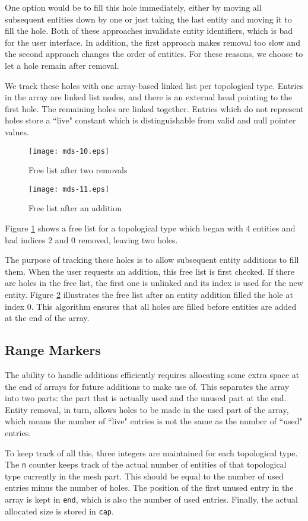 \documentclass{article}
\begin{document}
One option would be to fill this hole immediately, either by
moving all subsequent entities down by one or just taking the last entity
and moving it to fill the hole.
Both of these approaches invalidate entity identifiers, which
is bad for the user interface.
In addition, the first approach makes removal too slow
and the second approach changes the order of entities.
For these reasons, we choose to let a hole remain after removal.

We track these holes with one array-based linked list per
topological type.
Entries in the array are linked list nodes, and there is
an external head pointing to the first hole.
The remaining holes are linked together.
Entries which do not represent holes store a ``live"
constant which is distinguishable from valid and
null pointer values.

\begin{figure}[ht!]
\centering
\texttt{[image: mds-10.eps]}
\caption{Free list after two removals}
\label{fig:free1}
\end{figure}

\begin{figure}[ht!]
\centering
\texttt{[image: mds-11.eps]}
\caption{Free list after an addition}
\label{fig:free2}
\end{figure}

Figure \ref{fig:free1} shows a free list for a topological
type which began with 4 entities and had indices 2 and
0 removed, leaving two holes.

The purpose of tracking these holes is to allow subsequent
entity additions to fill them.
When the user requests an addition, this free list is first
checked.
If there are holes in the free list, the first one is unlinked
and its index is used for the new entity.
Figure \ref{fig:free2} illustrates the free list after an
entity addition filled the hole at index 0.
This algorithm ensures that all holes are filled before entities are added
at the end of the array.

\subsection{Range Markers}

The ability to handle additions efficiently requires allocating
some extra space at the end of arrays for future additions
to make use of. 
This separates the array into two parts: the part that is actually
used and the unused part at the end.
Entity removal, in turn, allows holes to be made in the used part
of the array, which means the number of ``live" entries is not
the same as the number of ``used" entries.

To keep track of all this, three integers are maintained for
each topological type.
The \texttt{n} counter keeps track of the actual number of entities
of that topological type currently in the mesh part.
This should be equal to the number of used entries minus the number
of holes.
The position of the first unused entry in the array is kept in
\texttt{end}, which is also the number of used entries.
Finally, the actual allocated size is stored in \texttt{cap}.

{}

\end{document}
